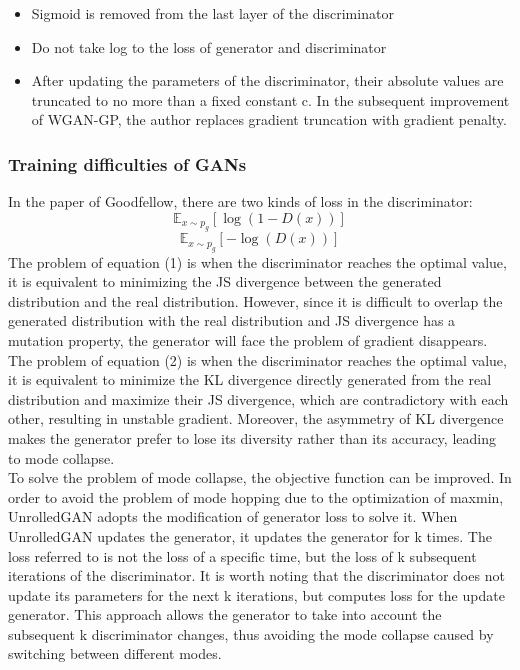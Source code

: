 \documentclass[11pt,a4paper]{article}
\begin{document}
\begin{itemize}
    \item Sigmoid is removed from the last layer of the discriminator
    \item Do not take log to the loss of generator and discriminator 
    \item After updating the parameters of the discriminator, their absolute values are truncated to no more than a fixed constant c. In the subsequent improvement of WGAN-GP\citep{gulrajani2017improved}, the author replaces gradient truncation with gradient penalty.
\end{itemize}{}
\subsubsection{Training difficulties of GANs}
In the paper of Goodfellow, there are two kinds of loss in the discriminator:
\newline
\begin{equation}
\mathbb{E}_{x \sim p_{g}}[\log (1-D(x))]
\end{equation}
\begin{equation}
\mathbb{E}_{x \sim p_{g}}[-\log (D(x))]
\end{equation}
\newline
The problem of equation (1) is when the discriminator reaches the optimal value, it is equivalent to minimizing the JS divergence between the generated distribution and the real distribution. However, since it is difficult to overlap the generated distribution with the real distribution and JS divergence has a mutation property, the generator will face the problem of gradient disappears.
\\
\newline
The problem of equation (2) is when the discriminator reaches the optimal value, it is equivalent to minimize the KL divergence directly generated from the real distribution and maximize their JS divergence, which are contradictory with each other, resulting in unstable gradient. Moreover, the asymmetry of KL divergence makes the generator prefer to lose its diversity rather than its accuracy, leading to mode collapse.
\\
\newline
To solve the problem of mode collapse, the objective function can be improved. In order to avoid the problem of mode hopping due to the optimization of maxmin, UnrolledGAN\citep{Metz2016unrolled} adopts the modification of generator loss to solve it. When UnrolledGAN updates the generator, it updates the generator for k times. The loss referred to is not the loss of a specific time, but the loss of k subsequent iterations of the discriminator. It is worth noting that the discriminator does not update its parameters for the next k iterations, but computes loss for the update generator. This approach allows the generator to take into account the subsequent k discriminator changes, thus avoiding the mode collapse caused by switching between different modes.
\end{document}
